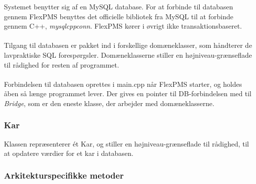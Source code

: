 Systemet benytter sig af en MySQL database. For at forbinde til databasen gennem FlexPMS benyttes det officielle bibliotek fra MySQL til at forbinde gennem C++, \textit{mysqlcppconn}. FlexPMS kører i øvrigt ikke transaktionsbaseret.\\\\

Tilgang til databasen er pakket ind i forskellige domæneklasser, som håndterer de lavpraktiske SQL forespørgsler. Domæneklasserne stiller en højniveau-grænseflade til rådighed for resten af programmet.\\\\

Forbindelsen til databasen oprettes i main.cpp når FlexPMS starter, og holdes åben så længe programmet lever. Der gives en pointer til DB-forbindelsen med til \textit{Bridge}, som er den eneste klasse, der arbejder med domæneklasserne.



\subsubsection{Kar}
Klassen repræsenterer ét Kar, og stiller en højniveau-grænseflade til rådighed, til at opdatere værdier for et kar i databasen.

\subsubsection{Arkitekturspecifikke metoder}

{
}

{
}

{
}

{
}


